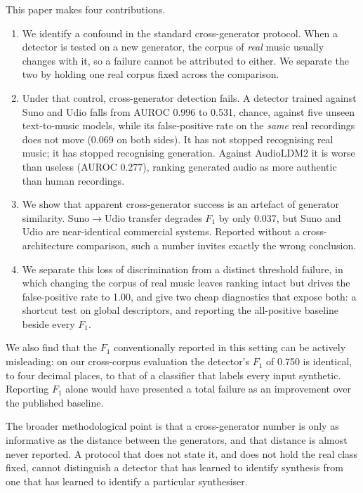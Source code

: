 This paper makes four contributions.

\begin{enumerate}
  \item We identify a confound in the standard cross-generator protocol. When a
        detector is tested on a new generator, the corpus of \emph{real} music
        usually changes with it, so a failure cannot be attributed to either.
        We separate the two by holding one real corpus fixed across the
        comparison.
  \item Under that control, cross-generator detection fails. A detector trained
        against Suno and Udio falls from AUROC 0.996 to 0.531, chance,
        against five unseen text-to-music models, while its false-positive
        rate on the \emph{same} real recordings does not move (0.069 on both
        sides). It has not stopped recognising real music; it has stopped
        recognising generation. Against AudioLDM2 it is worse than useless
        (AUROC 0.277), ranking generated audio as more authentic than human
        recordings.
  \item We show that apparent cross-generator success is an artefact of
        generator similarity. Suno$\rightarrow$Udio transfer degrades $F_1$ by
        only 0.037, but Suno and Udio are near-identical commercial systems.
        Reported without a cross-architecture comparison, such a number invites
        exactly the wrong conclusion.
  \item We separate this loss of discrimination from a distinct threshold
        failure, in which changing the corpus of real music leaves ranking
        intact but drives the false-positive rate to 1.00, and give two cheap
        diagnostics that expose both: a shortcut test on global descriptors, and
        reporting the all-positive baseline beside every $F_1$.
\end{enumerate}

We also find that the $F_1$ conventionally reported in this setting can be
actively misleading: on our cross-corpus evaluation the detector's $F_1$ of
0.750 is identical, to four decimal places, to that of a classifier that labels
every input synthetic. Reporting $F_1$ alone would have presented a total
failure as an improvement over the published baseline.

The broader methodological point is that a cross-generator number is only as
informative as the distance between the generators, and that distance is almost
never reported. A protocol that does not state it, and does not hold the real
class fixed, cannot distinguish a detector that has learned to identify
synthesis from one that has learned to identify a particular synthesiser.
